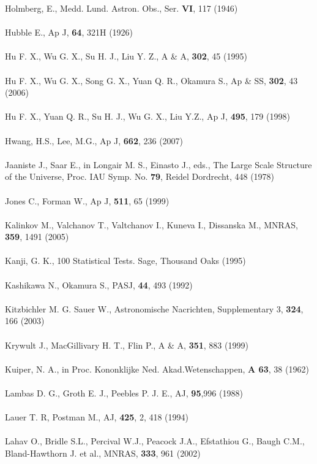 Holmberg, E., Medd. Lund. Astron. Obs., Ser. \textbf{VI}, 117 (1946)\\\\
Hubble E., Ap J, \textbf{64}, 321H (1926)\\\\
Hu F. X., Wu G. X., Su H. J., Liu Y. Z., A \& A, \textbf{302}, 45 (1995)\\\\
Hu F. X., Wu G. X., Song G. X., Yuan Q. R., Okamura S., Ap \& SS, \textbf{302}, 43 (2006)\\\\
Hu F. X., Yuan Q. R., Su H. J., Wu G. X., Liu Y.Z., Ap J, \textbf{495}, 179 (1998)\\\\
Hwang, H.S., Lee, M.G., Ap J, \textbf{662}, 236 (2007)\\\\
Jaaniste J., Saar E., in Longair M. S., Einasto J., eds., The Large Scale Structure of the
Universe, Proc. IAU Symp. No. \textbf{79}, Reidel Dordrecht, 448 (1978)\\\\
Jones C., Forman W., Ap J, \textbf{511}, 65 (1999)\\\\
Kalinkov M., Valchanov T., Valtchanov I., Kuneva I., Dissanska M., MNRAS, \textbf{359}, 1491 (2005)\\\\
Kanji, G. K., 100 Statistical Tests. Sage, Thousand Oaks (1995)\\\\
Kashikawa N., Okamura S., PASJ, \textbf{44}, 493 (1992)\\\\
Kitzbichler M. G. Sauer W., Astronomische Nacrichten, Supplementary  3, \textbf{324}, 166 (2003)\\\\
Krywult J., MacGillivary H. T., Flin P., A \& A, \textbf{351}, 883 (1999)\\\\
Kuiper, N. A., in Proc. Kononklijke Ned. Akad.Wetenschappen, \textbf{A 63}, 38 (1962)\\\\
Lambas D. G., Groth E. J., Peebles P. J. E., AJ, \textbf{95},996 (1988)\\\\
Lauer T. R, Postman M., AJ,\textbf{ 425},  2, 418 (1994)\\\\
Lahav O., Bridle S.L., Percival W.J., Peacock J.A., Efstathiou G., Baugh C.M., Bland-Hawthorn J. et al., MNRAS, \textbf{333}, 961 (2002)\\\\
